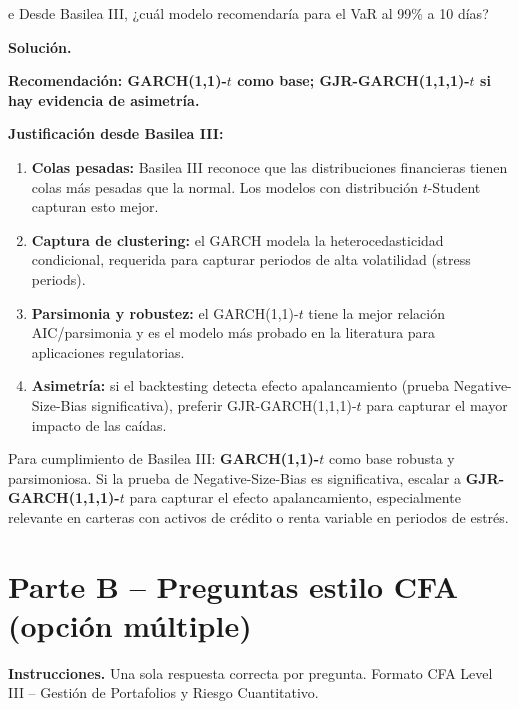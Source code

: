 \documentclass[11pt,a4paper]{article}
\begin{document}
\begin{cajaInciso}{e}
Desde Basilea III, ¿cuál modelo recomendaría para el VaR al 99\% a 10 días?
\end{cajaInciso}

\textbf{Solución.}

\textbf{Recomendación: GARCH(1,1)-$t$ como base; GJR-GARCH(1,1,1)-$t$ si hay evidencia de asimetría.}

\textbf{Justificación desde Basilea III:}
\begin{enumerate}[leftmargin=*]
  \item \textbf{Colas pesadas:} Basilea III reconoce que las distribuciones financieras tienen colas más pesadas que la normal. Los modelos con distribución $t$-Student capturan esto mejor.
  \item \textbf{Captura de clustering:} el GARCH modela la heterocedasticidad condicional, requerida para capturar periodos de alta volatilidad (stress periods).
  \item \textbf{Parsimonia y robustez:} el GARCH(1,1)-$t$ tiene la mejor relación AIC/parsimonia y es el modelo más probado en la literatura para aplicaciones regulatorias.
  \item \textbf{Asimetría:} si el backtesting detecta efecto apalancamiento (prueba Negative-Size-Bias significativa), preferir GJR-GARCH(1,1,1)-$t$ para capturar el mayor impacto de las caídas.
\end{enumerate}

\begin{cajaHallazgo}
Para cumplimiento de Basilea III: \textbf{GARCH(1,1)-$t$} como base robusta y parsimoniosa. Si la prueba de Negative-Size-Bias es significativa, escalar a \textbf{GJR-GARCH(1,1,1)-$t$} para capturar el efecto apalancamiento, especialmente relevante en carteras con activos de crédito o renta variable en periodos de estrés.
\end{cajaHallazgo}

\newpage
\section{Parte B -- Preguntas estilo CFA (opción múltiple)}

\textbf{Instrucciones.} Una sola respuesta correcta por pregunta. Formato CFA Level III -- Gestión de Portafolios y Riesgo Cuantitativo.
\end{document}
